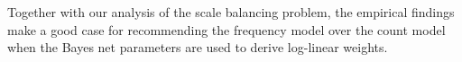 \documentclass[twoside,leqno,twocolumn]{article}
\begin{document}





Together with our analysis of the scale balancing problem,
the empirical findings make a good case for recommending the frequency model over the count model when the Bayes net parameters are used to derive log-linear weights.



\end{document}
